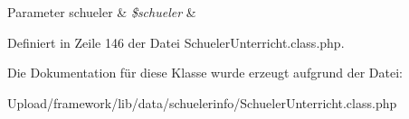 \begin{DoxyParams}[1]{Parameter}
schueler & {\em \$schueler} & \\
\hline
\end{DoxyParams}


Definiert in Zeile 146 der Datei Schueler\+Unterricht.\+class.\+php.



Die Dokumentation für diese Klasse wurde erzeugt aufgrund der Datei\+:\begin{DoxyCompactItemize}
\item 
Upload/framework/lib/data/schuelerinfo/Schueler\+Unterricht.\+class.\+php\end{DoxyCompactItemize}
